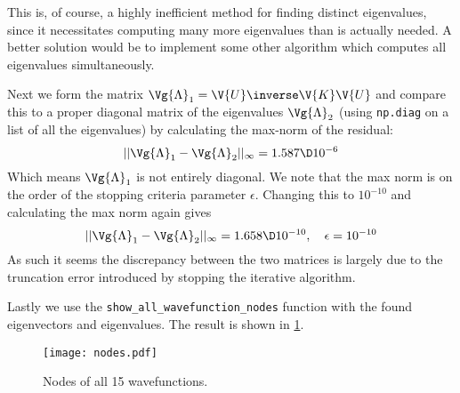 \documentclass[a4paper,10pt]{article}
\begin{document}
	This is, of course, a highly inefficient method for finding distinct eigenvalues, since it necessitates computing many more eigenvalues than is actually needed. A better solution would be to implement some other algorithm which computes all eigenvalues simultaneously.
	
	Next we form the matrix $ \Vg{\Lambda}_1 = \V{U}\inverse \V{K} \V{U} $ and compare this to a proper diagonal matrix of the eigenvalues $ \Vg{\Lambda}_2 $ (using \texttt{np.diag} on a list of all the eigenvalues) by calculating the max-norm of the residual:
	\begin{equation}\label{key}
		|| \Vg{\Lambda}_1 - \Vg{\Lambda}_2 ||_{\infty} = 1.587 \D 10^{-6}
	\end{equation}
	Which means $ \Vg{\Lambda}_1 $ is not entirely diagonal. We note that the max norm is on the order of the stopping criteria parameter $ \epsilon $. Changing this to $ 10^{-10} $ and calculating the max norm again gives
	\begin{equation}\label{key}
	|| \Vg{\Lambda}_1 - \Vg{\Lambda}_2 ||_{\infty} = 1.658 \D 10^{-10}, \quad \epsilon=10^{-10}
	\end{equation}
	As such it seems the discrepancy between the two matrices is largely due to the truncation error introduced by stopping the iterative algorithm.
	
	Lastly we use the \texttt{show\_all\_wavefunction\_nodes} function with the found eigenvectors and eigenvalues. The result is shown in \ref{fig:nodes}.
	
	
	\begin{figure}[H]
		\centering
		\texttt{[image: nodes.pdf]}
		\caption{Nodes of all 15 wavefunctions.}
		\label{fig:nodes}
	\end{figure}
	
	
\end{document}
